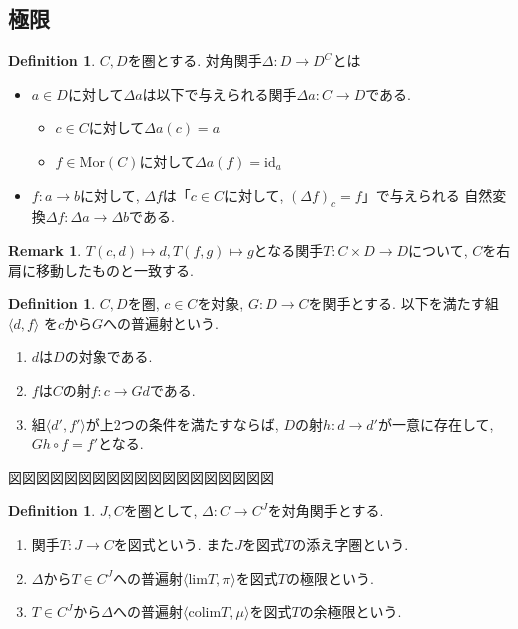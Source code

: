\documentclass[a4paper,10pt]{article}
\theoremstyle{definition}
\newtheorem{definition}[thm]{\bfseries Definition}
\newtheorem{remark}[thm]{\bfseries Remark}    %
\begin{document}
\subsection{極限}
\begin{definition}
    $C,D$を圏とする. 対角関手$\Delta: D \rightarrow D^{C}$とは
    \begin{itemize}
        \item $a \in D$に対して$\Delta a$は以下で与えられる関手$\Delta a: C \rightarrow D$である.
        \begin{itemize}
            \item $c \in C$に対して$\Delta a(c)=a$
            \item $f \in \textrm{Mor}(C)$に対して$\Delta a(f)=\textrm{id}_a$
        \end{itemize}
        \item $f : a \rightarrow b$に対して, $\Delta f$は「$c \in C$に対して, $(\Delta f)_c=f$」で与えられる
        自然変換$\Delta f: \Delta a \rightarrow \Delta b$である.
    \end{itemize}
\end{definition}
\begin{remark}
    $T(c,d) \mapsto d, T(f,g) \mapsto g$となる関手$T: C \times D \rightarrow D$について,
    $C$を右肩に移動したものと一致する.
\end{remark}
\begin{definition}
    $C,D$を圏, $c \in C$を対象, $G: D \rightarrow C$を関手とする. 以下を満たす組$\langle d,f\rangle$
    を$c$から$G$への普遍射という.
    \begin{enumerate}[(1)]
        \item $d$は$D$の対象である.
        \item $f$は$C$の射$f: c \rightarrow Gd$である.
        \item 組$\langle d', f' \rangle$が上2つの条件を満たすならば, $D$の射$h: d \rightarrow d'$が一意に存在して,
        $Gh \circ f=f'$となる.
    \end{enumerate}
\end{definition}
図図図図図図図図図図図図図図図図図図図
\begin{definition}
    $J, C$を圏として, $\Delta: C \rightarrow C^{J}$を対角関手とする.
    \begin{enumerate}[(1)]
        \item 関手$T:J \rightarrow C$を図式という. また$J$を図式$T$の添え字圏という.
        \item $\Delta$から$T \in C^{J}$への普遍射$\langle \textrm{lim}T, \pi \rangle$を図式$T$の極限という.
        \item $T \in C^{J}$から$\Delta$への普遍射$\langle \textrm{colim}T, \mu \rangle$を図式$T$の余極限という.
    \end{enumerate}
\end{definition}
\end{document}
